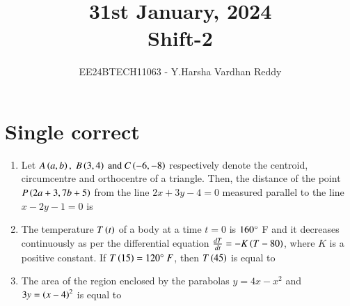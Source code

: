 \documentclass[journal,,12pt,onecolumn]{IEEEtran}
\theoremstyle{remark}
\begin{document}

\vspace{3cm}

\title{31st January, 2024\\Shift-2}
\author{EE24BTECH11063 - Y.Harsha Vardhan Reddy}
\maketitle

\bigskip

\renewcommand{\thefigure}{\theenumi}
\renewcommand{\thetable}{\theenumi}

\section*{Single correct}
\begin{enumerate}
    \item Let $A\left(a,b\right),\;B\left(3,4\right)\text{ and } C\left(-6,-8\right)$ respectively denote the centroid, circumcentre and orthocentre of a triangle. Then, the distance of the point $P\left(2a+3,7b+5\right)$ from the line $2x+3y-4=0$ measured parallel to the line $x-2y-1=0$ is 
    \begin{enumerate}
    \end{enumerate}
    \bigskip
\item The temperature $T\left(t\right)$ of a body at a time $t=0$ is $160\degree$ F and it decreases continuously as per the differential equation $\frac{dT}{dt}=-K\left(T-80\right)$, where $K$ is a positive constant. If $T\left(15\right)=120\degree \;F$, then $T\left(45\right)$ is equal to
\begin{enumerate}
\end{enumerate}
\bigskip
\item The area of the region enclosed by the parabolas $y=4x-x^2$ and $3y=\left(x-4\right)^2$ is equal to

\end{enumerate}
\end{document}
